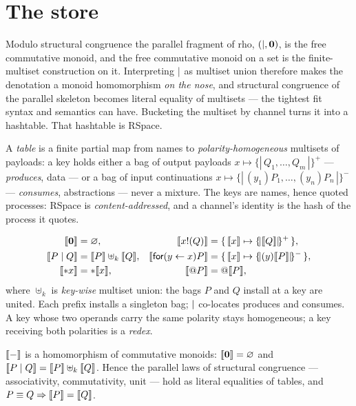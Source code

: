 \section{The store}
\label{rs:sec:store}

Modulo structural congruence the parallel fragment of rho, $(\mid, \mathbf{0})$, is the free
commutative monoid, and the free commutative monoid on a set is the finite-multiset
construction on it. Interpreting $\mid$ as multiset union therefore makes the denotation a
monoid homomorphism \emph{on the nose}, and structural congruence of the parallel skeleton
becomes literal equality of multisets --- the tightest fit syntax and semantics can have.
Bucketing the multiset by channel turns it into a hashtable. That hashtable is RSpace.

\begin{definition}[Tables]
\label{rs:def:table}
A \emph{table} is a finite partial map from names to \emph{polarity-homogeneous}
multisets of payloads: a key holds either a bag of output payloads
$x \mapsto \{\!|\,Q_1,\dots,Q_m\,|\!\}^{+}$ --- \emph{produces}, data --- or a bag of
input continuations $x \mapsto \{\!|\,(y_1)P_1,\dots,(y_n)P_n\,|\!\}^{-}$ --- \emph{consumes},
abstractions --- never a mixture. The keys are names, hence quoted processes: RSpace is
\emph{content-addressed}, and a channel's identity is the hash of the process it quotes.
\end{definition}

\begin{definition}
\label{rs:def:rspace}
\begin{align*}
  \llbracket \mathbf{0} \rrbracket&=\varnothing, &
  \llbracket x!(Q) \rrbracket&=\{\,\llbracket x \rrbracket\mapsto\{\!|\llbracket Q \rrbracket|\!\}^{+}\,\},\\
  \llbracket P\mid Q \rrbracket&=\llbracket P \rrbracket \uplus_{k} \llbracket Q \rrbracket, &
  \llbracket \textsf{for}(y\leftarrow x)P \rrbracket&=\{\,\llbracket x \rrbracket\mapsto\{\!|(y)\llbracket P \rrbracket|\!\}^{-}\,\},\\
  \llbracket *x \rrbracket &= *\llbracket x \rrbracket, & \llbracket @P \rrbracket &= @\llbracket P \rrbracket,
\end{align*}
where $\uplus_k$ is \emph{key-wise} multiset union: the bags $P$ and $Q$ install at a key
are united. Each prefix installs a singleton bag; $\mid$ co-locates produces and consumes.
A key whose two operands carry the same polarity stays homogeneous; a key receiving both
polarities is a \emph{redex}.
\end{definition}

\begin{proposition}
\label{rs:prop:hom}
$\llbracket - \rrbracket$ is a homomorphism of commutative monoids: $\llbracket \mathbf{0} \rrbracket=\varnothing$ and
$\llbracket P\mid Q \rrbracket=\llbracket P \rrbracket\uplus_k\llbracket Q \rrbracket$. Hence the parallel laws of structural congruence
--- associativity, commutativity, unit --- hold as literal equalities of tables, and
$P\equiv Q \Rightarrow \llbracket P \rrbracket=\llbracket Q \rrbracket$.
\end{proposition}

